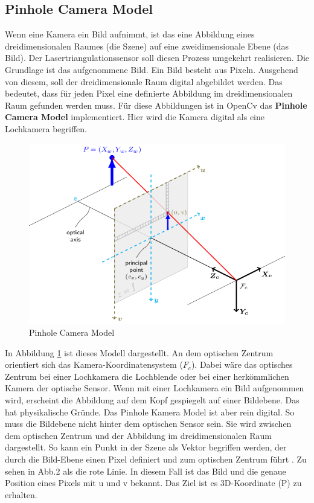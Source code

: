 	\subsection{Pinhole Camera Model}
	Wenn eine Kamera ein Bild aufnimmt, ist das eine Abbildung eines dreidimensionalen Raumes (die Szene) auf eine zweidimensionale Ebene (das Bild). Der Lasertriangulationssensor soll diesen Prozess umgekehrt realisieren. Die Grundlage ist das aufgenommene Bild. Ein Bild besteht aus Pixeln. Ausgehend von diesem, soll der dreidimensionale Raum digital abgebildet werden. Das bedeutet, dass für jeden Pixel eine definierte Abbildung im dreidimensionalen Raum gefunden werden muss. Für diese Abbildungen ist in OpenCv das \textbf{Pinhole Camera Model} implementiert. Hier wird die Kamera digital als eine Lochkamera begriffen. \newline
	\begin{figure}[h]
		\centering
		\includegraphics[width=0.7\linewidth]{img/grundlagen/pinhole_camera_model.png}
		\caption{Pinhole Camera Model}
		\label{fig:pinhole-camera-model}
	\end{figure}
	In Abbildung \ref{fig:pinhole-camera-model} ist dieses Modell dargestellt. An dem optischen Zentrum orientiert sich das Kamera-Koordinatensystem (\( F_c \)). Dabei wäre das optisches Zentrum bei einer Lochkamera die Lochblende oder bei einer herkömmlichen Kamera der optische Sensor. Wenn mit einer Lochkamera ein Bild aufgenommen wird, erscheint die Abbildung auf dem Kopf gespiegelt auf einer Bildebene. Das hat physikalische Gründe. Das Pinhole Kamera Model ist aber rein digital. So muss die Bildebene nicht hinter dem optischen Sensor sein. Sie wird zwischen dem optischen Zentrum und der Abbildung im dreidimensionalen Raum dargestellt. So kann ein Punkt in der Szene als Vektor begriffen werden, der durch die Bild-Ebene einen Pixel definiert und zum optischen Zentrum führt \citep[Vgl.][]{dawson-howe_simple_1994}. Zu sehen in Abb.2 als die rote Linie. In diesem Fall ist das Bild und die genaue Position eines Pixels mit u und v bekannt. Das Ziel ist es 3D-Koordinate (P) zu erhalten.
	\newpage
	
